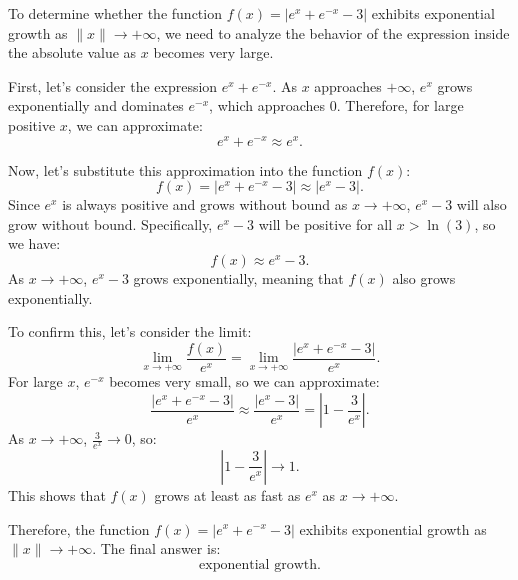 To determine whether the function \( f(x) = |e^x + e^{-x} - 3| \) exhibits exponential growth as \( \|x\| \to +\infty \), we need to analyze the behavior of the expression inside the absolute value as \( x \) becomes very large.

First, let's consider the expression \( e^x + e^{-x} \). As \( x \) approaches \( +\infty \), \( e^x \) grows exponentially and dominates \( e^{-x} \), which approaches 0. Therefore, for large positive \( x \), we can approximate:
\[ e^x + e^{-x} \approx e^x. \]

Now, let's substitute this approximation into the function \( f(x) \):
\[ f(x) = |e^x + e^{-x} - 3| \approx |e^x - 3|. \]
Since \( e^x \) is always positive and grows without bound as \( x \to +\infty \), \( e^x - 3 \) will also grow without bound. Specifically, \( e^x - 3 \) will be positive for all \( x > \ln(3) \), so we have:
\[ f(x) \approx e^x - 3. \]
As \( x \to +\infty \), \( e^x - 3 \) grows exponentially, meaning that \( f(x) \) also grows exponentially.

To confirm this, let's consider the limit:
\[ \lim_{x \to +\infty} \frac{f(x)}{e^x} = \lim_{x \to +\infty} \frac{|e^x + e^{-x} - 3|}{e^x}. \]
For large \( x \), \( e^{-x} \) becomes very small, so we can approximate:
\[ \frac{|e^x + e^{-x} - 3|}{e^x} \approx \frac{|e^x - 3|}{e^x} = \left|1 - \frac{3}{e^x}\right|. \]
As \( x \to +\infty \), \( \frac{3}{e^x} \to 0 \), so:
\[ \left|1 - \frac{3}{e^x}\right| \to 1. \]
This shows that \( f(x) \) grows at least as fast as \( e^x \) as \( x \to +\infty \).

Therefore, the function \( f(x) = |e^x + e^{-x} - 3| \) exhibits exponential growth as \( \|x\| \to +\infty \). The final answer is:
\[ \boxed{\text{exponential growth}}. \]